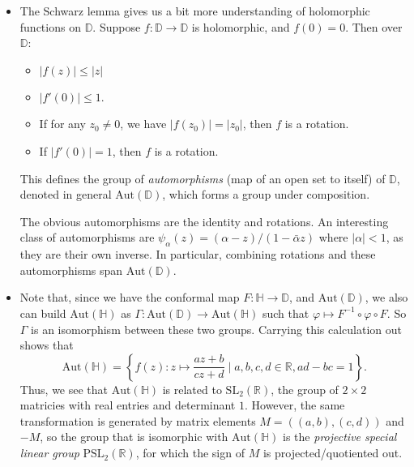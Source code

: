 \documentclass[11pt,
        usenames, %
        dvipsnames %
    ]{report}
\newcommand*{\abs}[1]{\left|#1\right|}
\newcommand*{\p}[1]{\left(#1\right)}
\newcommand*{\z}[1]{\left\{#1\right\}}
\begin{document}
\begin{itemize}
    \item The Schwarz lemma gives us a bit more understanding of holomorphic
        functions on $\mathbb{D}$. Suppose $f: \mathbb{D} \to \mathbb{D}$ is
        holomorphic, and $f(0) = 0$. Then over $\mathbb{D}$:
        \begin{itemize}
            \item $\abs{f(z)} \leq \abs{z}$
            \item $\abs{f'(0)} \leq 1$.
            \item If for any $z_0 \neq 0$, we have $\abs{f\p{z_0}} = \abs{z_0}$,
                then $f$ is a rotation.
            \item If $\abs{f'(0)} = 1$, then $f$ is a rotation.
        \end{itemize}
        This defines the group of \emph{automorphisms} (map of an open set to
        itself) of $\mathbb{D}$, denoted in general $\mathrm{Aut}(\mathbb{D})$,
        which forms a group under composition.

        The obvious automorphisms are the identity and rotations. An interesting
        class of automorphisms are $\psi_\alpha(z) = (\alpha - z) / (1 -
        \bar{\alpha}z)$ where $\abs{\alpha} < 1$, as they are their own inverse.
        In particular, combining rotations and these automorphisms span
        $\mathrm{Aut}(\mathbb{D})$.

    \item Note that, since we have the conformal map $F: \mathbb{H} \to
        \mathbb{D}$, and $\mathrm{Aut}\p{\mathbb{D}}$, we also can build
        $\mathrm{Aut}\p{\mathbb{H}}$ as $\Gamma: \mathrm{Aut}\p{\mathbb{D}} \to
        \mathrm{Aut}\p{\mathbb{H}}$ such that $\varphi \mapsto F^{-1} \circ
        \varphi \circ F$. So $\Gamma$ is an isomorphism between these two
        groups. Carrying this calculation out shows that
        \begin{equation}
            \mathrm{Aut}\p{\mathbb{H}} = \z{
                f(z): z \mapsto \frac{az + b}{cz + d} \mid
                a, b, c, d \in \mathbb{R}, ad - bc = 1}.
        \end{equation}
        Thus, we see that $\mathrm{Aut}\p{\mathbb{H}}$ is related to
        $\mathrm{SL}_2\p{\mathbb{R}}$, the group of $2 \times 2$ matricies with
        real entries and determinant $1$. However, the same transformation is
        generated by matrix elements $M = ((a, b), (c, d))$ and $-M$, so the
        group that is isomorphic with $\mathrm{Aut}\p{\mathbb{H}}$ is the
        \emph{projective special linear group} $\mathrm{PSL}_2\p{\mathbb{R}}$,
        for which the sign of $M$ is projected/quotiented out.


\end{itemize}
\end{document}

